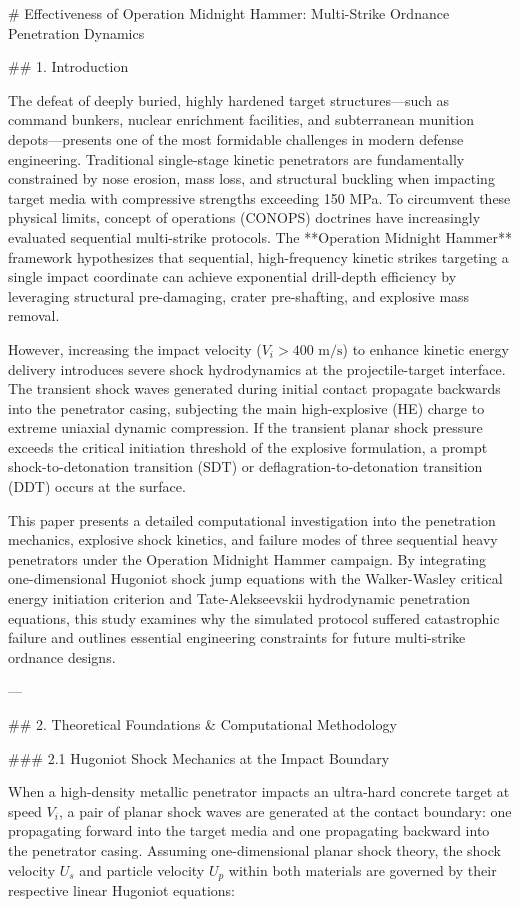 # Effectiveness of Operation Midnight Hammer: Multi-Strike Ordnance Penetration Dynamics

## 1. Introduction

The defeat of deeply buried, highly hardened target structures—such as command bunkers, nuclear enrichment facilities, and subterranean munition depots—presents one of the most formidable challenges in modern defense engineering. Traditional single-stage kinetic penetrators are fundamentally constrained by nose erosion, mass loss, and structural buckling when impacting target media with compressive strengths exceeding 150 MPa. To circumvent these physical limits, concept of operations (CONOPS) doctrines have increasingly evaluated sequential multi-strike protocols. The **Operation Midnight Hammer** framework hypothesizes that sequential, high-frequency kinetic strikes targeting a single impact coordinate can achieve exponential drill-depth efficiency by leveraging structural pre-damaging, crater pre-shafting, and explosive mass removal.

However, increasing the impact velocity ($V_i > 400\text{ m/s}$) to enhance kinetic energy delivery introduces severe shock hydrodynamics at the projectile-target interface. The transient shock waves generated during initial contact propagate backwards into the penetrator casing, subjecting the main high-explosive (HE) charge to extreme uniaxial dynamic compression. If the transient planar shock pressure exceeds the critical initiation threshold of the explosive formulation, a prompt shock-to-detonation transition (SDT) or deflagration-to-detonation transition (DDT) occurs at the surface.

This paper presents a detailed computational investigation into the penetration mechanics, explosive shock kinetics, and failure modes of three sequential heavy penetrators under the Operation Midnight Hammer campaign. By integrating one-dimensional Hugoniot shock jump equations with the Walker-Wasley critical energy initiation criterion and Tate-Alekseevskii hydrodynamic penetration equations, this study examines why the simulated protocol suffered catastrophic failure and outlines essential engineering constraints for future multi-strike ordnance designs.

---

## 2. Theoretical Foundations & Computational Methodology

### 2.1 Hugoniot Shock Mechanics at the Impact Boundary

When a high-density metallic penetrator impacts an ultra-hard concrete target at speed $V_i$, a pair of planar shock waves are generated at the contact boundary: one propagating forward into the target media and one propagating backward into the penetrator casing. Assuming one-dimensional planar shock theory, the shock velocity $U_s$ and particle velocity $U_p$ within both materials are governed by their respective linear Hugoniot equations:

